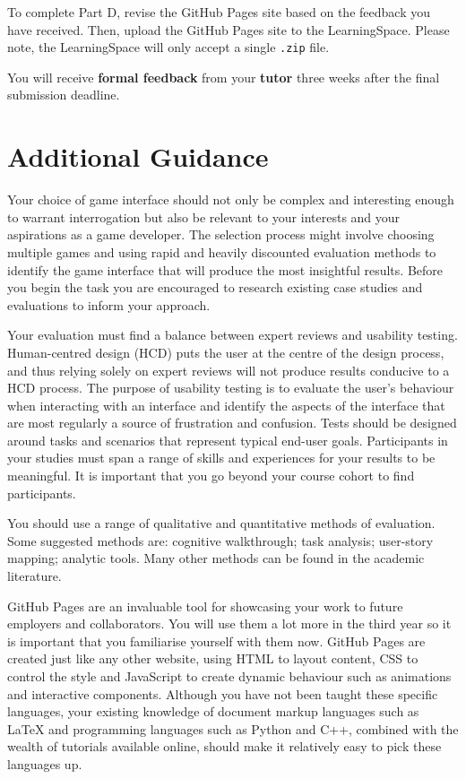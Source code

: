 \documentclass{../../fal_assignment}
\begin{document}
To complete Part D, revise the GitHub Pages site based on the feedback you have received. Then, upload the GitHub Pages site to the LearningSpace. Please note, the LearningSpace will only accept a single \texttt{.zip} file.

You will receive \textbf{formal feedback} from your \textbf{tutor} three weeks after the final submission deadline.

\section*{Additional Guidance}

Your choice of game interface should not only be complex and interesting enough to warrant interrogation but also be relevant to your interests and your aspirations as a game developer. The selection process might involve choosing multiple games and using rapid and heavily discounted evaluation methods to identify the game interface that will produce the most insightful results. Before you begin the task you are encouraged to research existing case studies and evaluations to inform your approach. 

Your evaluation must find a balance between expert reviews and usability testing. Human-centred design (HCD) puts the user at the centre of the design process, and thus relying solely on expert reviews will not produce results conducive to a HCD process. The purpose of usability testing is to evaluate the user's behaviour when interacting with an interface and identify the aspects of the interface that are most regularly a source of frustration and confusion. Tests should be designed around tasks and scenarios that represent typical end-user goals. Participants in your studies must span a range of skills and experiences for your results to be meaningful. It is important that you go beyond your course cohort to find participants. 

You should use a range of qualitative and quantitative methods of evaluation. Some suggested methods are: cognitive walkthrough; task analysis; user-story mapping; analytic tools. Many other methods can be found in the academic literature.

GitHub Pages are an invaluable tool for showcasing your work to future employers and collaborators. You will use them a lot more in the third year so it is important that you familiarise yourself with them now. GitHub Pages are created just like any other website, using HTML to layout content, CSS to control the style and JavaScript to create dynamic behaviour such as animations and interactive components. Although you have not been taught these specific languages, your existing knowledge of document markup languages such as LaTeX and programming languages such as Python and C++, combined with the wealth of tutorials available online, should make it relatively easy to pick these languages up.
\end{document}
